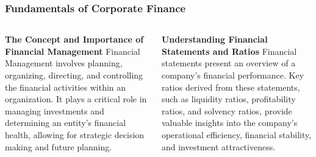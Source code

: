 \documentclass[5pt]{beamer}
\begin{document}
\begin{frame}
\frametitle{Fundamentals of Corporate Finance}
\begin{columns}
\begin{column}{0.45\textwidth}
\begin{block}{\textbf{The Concept and Importance of Financial Management}}
Financial Management involves planning, organizing, directing, and controlling the financial activities within an organization. It plays a critical role in managing investments and determining an entity's financial health, allowing for strategic decision making and future planning.
\end{block}
\end{column}
\begin{column}{0.45\textwidth}
\begin{block}{\textbf{Understanding Financial Statements and Ratios}}
Financial statements present an overview of a company's financial performance. Key ratios derived from these statements, such as liquidity ratios, profitability ratios, and solvency ratios, provide valuable insights into the company's operational efficiency, financial stability, and investment attractiveness.
\end{block}
\end{column}
\end{columns}
\end{frame}
\end{document}
